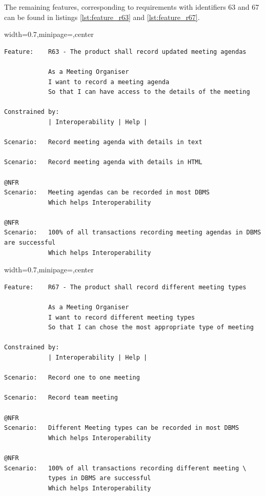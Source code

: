 \documentclass[dissertation,final]{softeng}
\newenvironment{featurecode}[1]
{ \lrbox\featurebox \begin{adjustbox}{width=#1\textwidth,minipage=\textwidth,center} }
{ \end{adjustbox}\endlrbox}
\newenvironment{featurelist}[2]
{
\newcommand{\setcaption}{\caption{#1}}
\newcommand{\setlabel}{\label{#2}}
}
{\begin{listing}[h!]\centering\usebox\featurebox\setcaption\setlabel\end{listing}}
\begin{document}
The remaining features, corresponding to requirements with identifiers 63 and 67 can be found in listings \ref{lst:feature_r63} and \ref{lst:feature_r67}.

\begin{featurelist}{R63 -- The product shall record updated meeting agendas}{lst:feature_r63}
\begin{featurecode}{0.7}
\begin{verbatim}
Feature:    R63 - The product shall record updated meeting agendas

            As a Meeting Organiser
            I want to record a meeting agenda
            So that I can have access to the details of the meeting
	
Constrained by:
            | Interoperability | Help |

Scenario:   Record meeting agenda with details in text

Scenario:   Record meeting agenda with details in HTML

@NFR	
Scenario:   Meeting agendas can be recorded in most DBMS
            Which helps Interoperability

@NFR	
Scenario:   100% of all transactions recording meeting agendas in DBMS are successful
            Which helps Interoperability
\end{verbatim}
\end{featurecode}
\end{featurelist}

\begin{featurelist}{R67 -- The product shall record different meeting types}{lst:feature_r67}
\begin{featurecode}{0.7}
\begin{verbatim}
Feature:    R67 - The product shall record different meeting types

            As a Meeting Organiser
            I want to record different meeting types
            So that I can chose the most appropriate type of meeting
	
Constrained by:
            | Interoperability | Help |

Scenario:   Record one to one meeting

Scenario:   Record team meeting
	
@NFR	
Scenario:   Different Meeting types can be recorded in most DBMS
            Which helps Interoperability

@NFR
Scenario:   100% of all transactions recording different meeting \
            types in DBMS are successful
            Which helps Interoperability
\end{verbatim}
\end{featurecode}
\end{featurelist}
\end{document}
